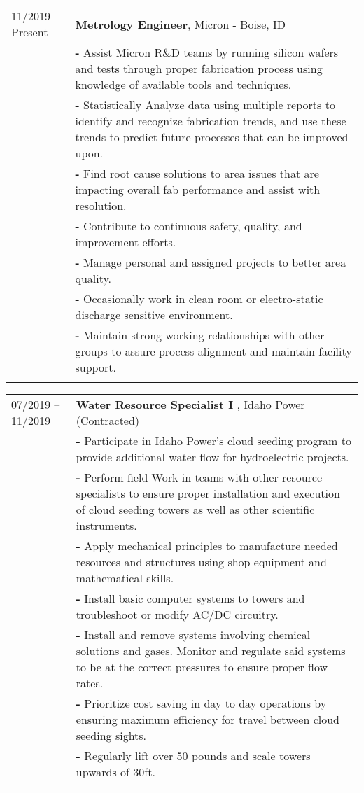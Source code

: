 \documentclass[a4paper,12pt]{article}
\begin{document}
\begin{tabularx}{\linewidth}{lX} %
11/2019 -- Present  & \textbf{Metrology Engineer}, Micron - Boise, ID \\
         & \textbf{-} Assist Micron R\&D teams by running silicon wafers and tests through proper fabrication process using knowledge of available tools and techniques.\\
         & \textbf{-} Statistically Analyze data using multiple reports to identify and recognize fabrication trends, and use these trends to predict future processes that can be improved upon.\\
         & \textbf{-} Find root cause solutions to area issues that are impacting overall fab performance and assist with resolution.\\
         & \textbf{-} Contribute to continuous safety, quality, and improvement efforts.\\
         & \textbf{-} Manage personal and assigned projects to better area quality.\\
         & \textbf{-} Occasionally work in clean room or electro-static discharge sensitive environment.\\
         & \textbf{-} Maintain strong working relationships with other groups to assure process alignment and maintain facility support.\\
         \\
\end{tabularx}

\begin{tabularx}{\linewidth}{lX}
07/2019 -- 11/2019 & \textbf{Water Resource Specialist I }, Idaho Power (Contracted)\\
         & \textbf{-} Participate in Idaho Power’s cloud seeding program to provide additional water flow for hydroelectric projects.\\
         & \textbf{-} Perform field Work in teams with other resource specialists to ensure proper installation and execution of cloud seeding towers as well as other scientific instruments.\\
         & \textbf{-} Apply mechanical principles to manufacture needed resources and structures using shop equipment and mathematical skills.\\ 
         & \textbf{-} Install basic computer systems to towers and troubleshoot or modify AC/DC circuitry. \\
         & \textbf{-} Install and remove systems involving chemical solutions and gases. Monitor and regulate said systems to be at the correct pressures to ensure proper flow rates. \\
         & \textbf{-} Prioritize cost saving in day to day operations by ensuring maximum efficiency for travel between cloud seeding sights. \\
         & \textbf{-} Regularly lift over 50 pounds and scale towers upwards of 30ft.\\
         \\
\end{tabularx}
\end{document}
